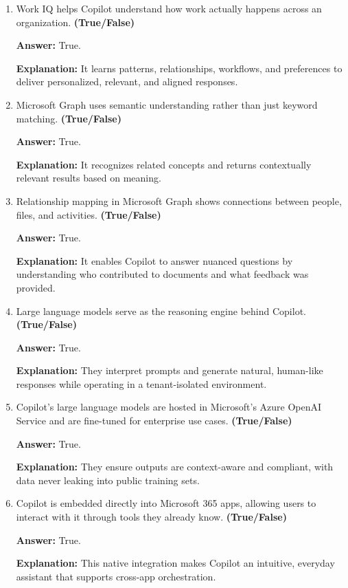 \documentclass[10pt]{article}
\begin{document}
\begin{enumerate}[leftmargin=*]
\item Work IQ helps Copilot understand how work actually happens across an organization. \textbf{(True/False)}

\textbf{Answer:} True.

\textbf{Explanation:} It learns patterns, relationships, workflows, and preferences to deliver personalized, relevant, and aligned responses.

\item Microsoft Graph uses semantic understanding rather than just keyword matching. \textbf{(True/False)}

\textbf{Answer:} True.

\textbf{Explanation:} It recognizes related concepts and returns contextually relevant results based on meaning.

\item Relationship mapping in Microsoft Graph shows connections between people, files, and activities. \textbf{(True/False)}

\textbf{Answer:} True.

\textbf{Explanation:} It enables Copilot to answer nuanced questions by understanding who contributed to documents and what feedback was provided.

\item Large language models serve as the reasoning engine behind Copilot. \textbf{(True/False)}

\textbf{Answer:} True.

\textbf{Explanation:} They interpret prompts and generate natural, human-like responses while operating in a tenant-isolated environment.

\item Copilot’s large language models are hosted in Microsoft’s Azure OpenAI Service and are fine-tuned for enterprise use cases. \textbf{(True/False)}

\textbf{Answer:} True.

\textbf{Explanation:} They ensure outputs are context-aware and compliant, with data never leaking into public training sets.

\item Copilot is embedded directly into Microsoft 365 apps, allowing users to interact with it through tools they already know. \textbf{(True/False)}

\textbf{Answer:} True.

\textbf{Explanation:} This native integration makes Copilot an intuitive, everyday assistant that supports cross-app orchestration.


\end{enumerate}
\end{document}
